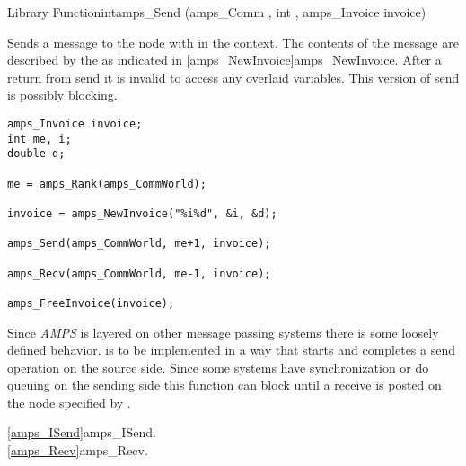 
\begin{deftypefn}{Library Function}{int}{amps\_Send}
(amps_Comm , int , amps_Invoice invoice) 

\DESCRIPTION

Sends a message to the node with  in the  context.
The contents of the message are described by the  as
indicated in \vref{amps_NewInvoice}{amps\_NewInvoice}.  After a return
from send it is invalid to access any overlaid variables.  This
version of send is possibly blocking.  

\EXAMPLE
\begin{display}\begin{verbatim}
amps_Invoice invoice;
int me, i;
double d;

me = amps_Rank(amps_CommWorld);

invoice = amps_NewInvoice("%i%d", &i, &d);

amps_Send(amps_CommWorld, me+1, invoice);

amps_Recv(amps_CommWorld, me-1, invoice);

amps_FreeInvoice(invoice);

\end{verbatim}\end{display}

\NOTES

Since {\em AMPS} is layered on other message passing systems there is
some loosely defined behavior.   is to be implemented
in a way that starts and completes a send operation on the source
side.  Since some systems have synchronization or do queuing on the
sending side this function can block until a receive is posted on the
node specified by .

\SEEALSO
\vref{amps_ISend}{amps\_ISend}. \\
\vref{amps_Recv}{amps\_Recv}. \\

\end{deftypefn}


